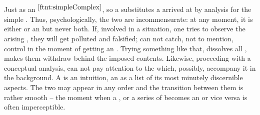\pa Just as an  $^{\ref{ftnt:simpleComplex}}$, so a 
 substitutes a  arrived at by analysis
for the simple .  Thus, 
psychologically, the two are incommensurate: at any  moment, it is
either  or an  but never both. If, involved in a
situation, one tries to observe the arising , they will get
polluted and falsified;  can not  catch, not to mention,
control  in the moment of getting an . Trying
something like that, dissolves all , makes them withdraw
behind the imposed  contents. Likewise, proceeding with a
conceptual analysis,  can not pay attention to the  which,
possibly, accompany it in the background.  A  is an
 intuition, an   as a list of
its most minutely discernible aspects. The two may appear in any order and the
transition between them is rather smooth -- the moment when a , or a
series of  becomes an  or vice versa is often
imperceptible.

